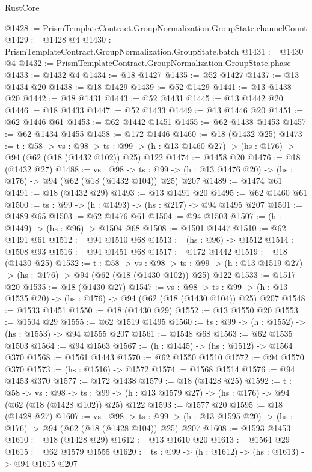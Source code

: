 \begin{lexlean}{RustCore}
\begin{coremodule}
@1428 := PrismTemplateContract.GroupNormalization.GroupState.channelCount
@1429 := @1428 @4
@1430 := PrismTemplateContract.GroupNormalization.GroupState.batch
@1431 := @1430 @4
@1432 := PrismTemplateContract.GroupNormalization.GroupState.phase
@1433 := @1432 @4
@1434 := @18 @1427
@1435 := @52 @1427
@1437 := @13 @1434 @20
@1438 := @18 @1429
@1439 := @52 @1429
@1441 := @13 @1438 @20
@1442 := @18 @1431
@1443 := @52 @1431
@1445 := @13 @1442 @20
@1446 := @18 @1433
@1447 := @52 @1433
@1449 := @13 @1446 @20
@1451 := @62 @1446 @61
@1453 := @62 @1442 @1451
@1455 := @62 @1438 @1453
@1457 := @62 @1434 @1455
@1458 := @172 @1446
@1460 := @18 (@1432 @25)
@1473 := {t : @58} ->
  {vs : @98} ->
  {ts : @99} -> (h : @13 @1460 @27) -> (hs : @176) -> @94 (@62 (@18 (@1432 @102)) @25) @122
@1474 := @1458 @20
@1476 := @18 (@1432 @27)
@1488 := {vs : @98} ->
  {ts : @99} -> (h : @13 @1476 @20) -> (hs : @176) -> @94 (@62 (@18 (@1432 @104)) @25) @207
@1489 := @1474 @61
@1491 := @18 (@1432 @29)
@1493 := @13 @1491 @20
@1495 := @62 @1460 @61
@1500 := {ts : @99} -> (h : @1493) -> (hs : @217) -> @94 @1495 @207
@1501 := @1489 @65
@1503 := @62 @1476 @61
@1504 := @94 @1503
@1507 := (h : @1449) -> (hs : @96) -> @1504 @68
@1508 := @1501 @1447
@1510 := @62 @1491 @61
@1512 := @94 @1510 @68
@1513 := (hs : @96) -> @1512
@1514 := @1508 @93
@1516 := @94 @1451 @68
@1517 := @172 @1442
@1519 := @18 (@1430 @25)
@1532 := {t : @58} ->
  {vs : @98} ->
  {ts : @99} -> (h : @13 @1519 @27) -> (hs : @176) -> @94 (@62 (@18 (@1430 @102)) @25) @122
@1533 := @1517 @20
@1535 := @18 (@1430 @27)
@1547 := {vs : @98} ->
  {ts : @99} -> (h : @13 @1535 @20) -> (hs : @176) -> @94 (@62 (@18 (@1430 @104)) @25) @207
@1548 := @1533 @1451
@1550 := @18 (@1430 @29)
@1552 := @13 @1550 @20
@1553 := @1504 @29
@1555 := @62 @1519 @1495
@1560 := {ts : @99} -> (h : @1552) -> (hs : @1553) -> @94 @1555 @207
@1561 := @1548 @68
@1563 := @62 @1535 @1503
@1564 := @94 @1563
@1567 := (h : @1445) -> (hs : @1512) -> @1564 @370
@1568 := @1561 @1443
@1570 := @62 @1550 @1510
@1572 := @94 @1570 @370
@1573 := (hs : @1516) -> @1572
@1574 := @1568 @1514
@1576 := @94 @1453 @370
@1577 := @172 @1438
@1579 := @18 (@1428 @25)
@1592 := {t : @58} ->
  {vs : @98} ->
  {ts : @99} -> (h : @13 @1579 @27) -> (hs : @176) -> @94 (@62 (@18 (@1428 @102)) @25) @122
@1593 := @1577 @20
@1595 := @18 (@1428 @27)
@1607 := {vs : @98} ->
  {ts : @99} -> (h : @13 @1595 @20) -> (hs : @176) -> @94 (@62 (@18 (@1428 @104)) @25) @207
@1608 := @1593 @1453
@1610 := @18 (@1428 @29)
@1612 := @13 @1610 @20
@1613 := @1564 @29
@1615 := @62 @1579 @1555
@1620 := {ts : @99} -> (h : @1612) -> (hs : @1613) -> @94 @1615 @207

\end{coremodule}
\end{lexlean}
